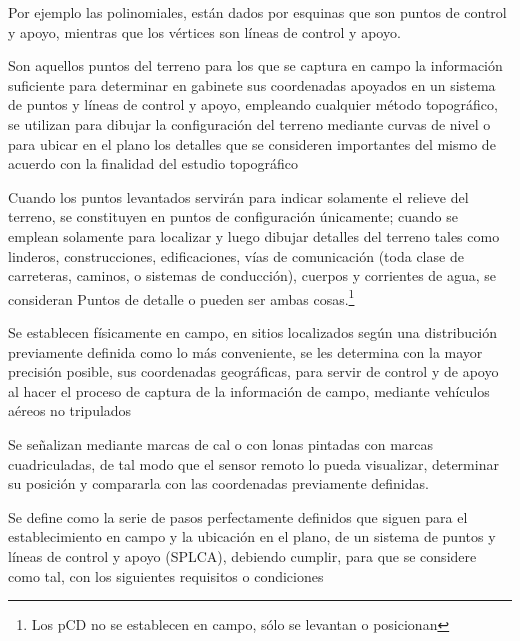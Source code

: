 Por ejemplo las polinomiales, están dados por esquinas que son puntos de control y apoyo, mientras que los vértices son líneas de control y apoyo.

\begin{definition}
    Son aquellos puntos del terreno para los que se captura en campo la información suficiente para determinar en gabinete sus coordenadas apoyados en un sistema de puntos y líneas de control y apoyo, empleando cualquier método topográfico, se utilizan para dibujar la configuración del terreno mediante curvas de nivel o para ubicar en el plano los detalles que se consideren importantes del mismo de acuerdo con la finalidad del estudio topográfico
\end{definition}

Cuando los puntos levantados servirán para indicar solamente el relieve del terreno, se constituyen en puntos de configuración únicamente; cuando se emplean solamente para localizar y luego dibujar detalles del terreno tales como linderos, construcciones, edificaciones, vías de comunicación (toda clase de carreteras, caminos, o sistemas de conducción),
cuerpos y corrientes de agua, se consideran Puntos de detalle o pueden ser ambas cosas.\footnote{Los pCD no se establecen en campo, sólo se levantan o posicionan}

\begin{definition}
    Se establecen físicamente en campo, en sitios localizados según una distribución previamente definida como lo más conveniente, se les determina con la mayor precisión posible, sus coordenadas geográficas, para servir de control y de apoyo al hacer el proceso de captura de la información de campo, mediante vehículos aéreos no tripulados
\end{definition}

Se señalizan mediante marcas de cal o con lonas pintadas con marcas cuadriculadas, de tal modo que el sensor remoto lo pueda visualizar, determinar su posición y compararla con las coordenadas previamente definidas. 

\begin{definition}
    Se define como la serie de pasos perfectamente definidos que siguen para el establecimiento en campo y la ubicación en el plano, de un sistema de puntos y líneas de control y apoyo (SPLCA), debiendo cumplir, para que se considere como tal, con los siguientes requisitos o condiciones
\end{definition}

